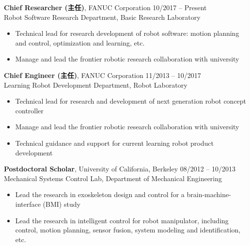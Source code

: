 \documentclass[UTF8,nofonts]{res}
\begin{document}
\begin{resume}
\begin{list}{}{\setlength\leftmargin{0in}\setlength\topsep{0.15in}}
\item {\bf Chief Researcher (主任)}, FANUC Corporation \hfill 10/2017 -- Present\\
Robot Software Research Department, Basic Research Laboratory
\begin{itemize}
	\item Technical lead for research development of robot software: motion planning and control, optimization and learning, etc.
	\item Manage and lead the frontier robotic research collaboration with university
\end{itemize}

\item {\bf Chief Engineer (主任)}, FANUC Corporation \hfill 11/2013 -- 10/2017\\
Learning Robot Development Department, Robot Laboratory
\begin{itemize}
	\item Technical lead for research and development of next generation robot concept controller
	\item Manage and lead the frontier robotic research collaboration with university
	\item Technical guidance and support for current learning robot product development
\end{itemize}

\item    {\bf Postdoctoral Scholar}, University of California, Berkeley    \hfill 08/2012 -- 10/2013\\
Mechanical Systems Control Lab, Department of Mechanical Engineering
\begin{itemize}
	\item Lead the research in exoskeleton design and control for a brain-machine-interface (BMI) study
	\item Lead the research in intelligent control for robot manipulator, including control, motion planning, sensor fusion, system modeling and identification, etc.
\end{itemize}




\end{list}
\end{resume}
\end{document}
